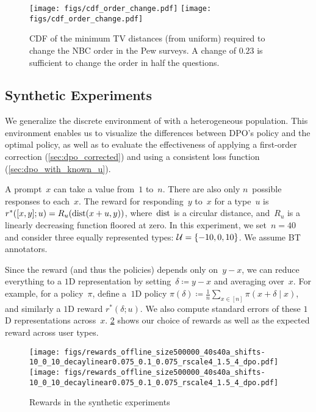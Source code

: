 \begin{figure}[h]
    \centering
    \ifarxiv
    \texttt{[image: figs/cdf\_order\_change.pdf]}
    \else
    \texttt{[image: figs/cdf\_order\_change.pdf]}
    \fi
    \caption{CDF of the minimum TV distances (from uniform) required to change the NBC order in the Pew surveys. A change of $0.23$ is sufficient to change the order in half the questions. }
    \label{fig:cdf_TV}
\end{figure}


\subsection{Synthetic Experiments}
\label{sec:simulate_dpo_with_unknown_u}

We generalize the discrete environment of \citet{xu2024dpo} with a heterogeneous population. This environment enables us to visualize the differences between DPO's policy and the optimal policy, as well as to evaluate the effectiveness of applying a first-order correction (\cref{sec:dpo_corrected}) and using a consistent loss function (\cref{sec:dpo_with_known_u}).

A prompt~$x$ can take a value from~$1$ to~$n$. There are also only $n$~possible responses to each~$x$. The reward for responding~$y$ to~$x$ for a type~$u$ is $r^*([x, y]; u) = R_u({\rm dist}(x + u, y))$, where~${\rm dist}$ is a circular distance, and~$R_u$ is a linearly decreasing function floored at zero. In this experiment, we set~$n=40$ and consider three equally represented types: ${\mathcal{U}} = \{-10, 0, 10\}$. We assume BT annotators.

Since the reward (and thus the policies) depends only on~$y - x$, we can reduce everything to a $1$D representation by setting~$\delta \coloneqq y-x$ and averaging over~$x$. For example, for a policy~$\pi$, define a~$1$D policy $\pi(\delta) \coloneqq \frac{1}{n}\sum_{x \in [n]} \pi(x + \delta \mid x)$, and similarly a $1$D reward $r^*(\delta; u)$. We also compute standard errors of these $1$D representations across~$x$. \cref{fig:sim_rewards} shows our choice of rewards as well as the expected reward across user types. 

\begin{figure}[h]
    \centering
    \ifarxiv
    \texttt{[image: figs/rewards\_offline\_size500000\_40s40a\_shifts-10\_0\_10\_decaylinear0.075\_0.1\_0.075\_rscale4\_1.5\_4\_dpo.pdf]}
    \else
    \texttt{[image: figs/rewards\_offline\_size500000\_40s40a\_shifts-10\_0\_10\_decaylinear0.075\_0.1\_0.075\_rscale4\_1.5\_4\_dpo.pdf]}
    \fi
    \vspace{-3mm}
    \caption{Rewards in the synthetic experiments}
    \label{fig:sim_rewards}
\end{figure}


